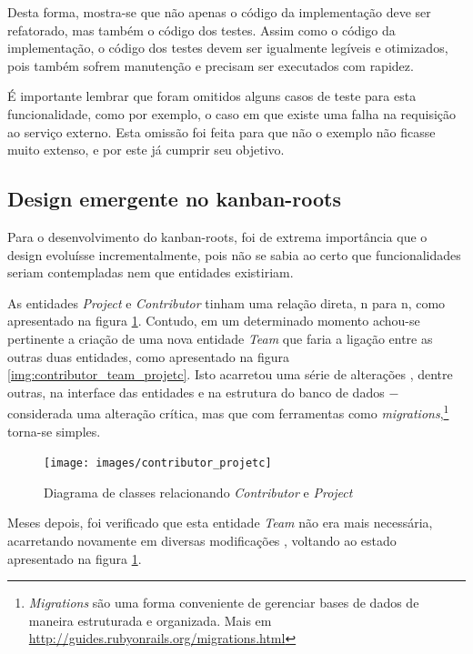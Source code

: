 Desta forma, mostra-se que não apenas o código da implementação deve ser refatorado, mas também o código dos testes. Assim como o código da implementação, o código dos testes devem ser igualmente legíveis e otimizados, pois também sofrem manutenção e precisam ser executados com rapidez.

É importante lembrar que foram omitidos alguns casos de teste para esta funcionalidade, como por exemplo, o caso em que existe uma falha na requisição ao serviço externo. Esta omissão foi feita para que não o exemplo não ficasse muito extenso, e por este já cumprir seu objetivo.


\subsection{Design emergente no kanban-roots}
\label{sub:design_emergente_no_kanban_roots}

Para o desenvolvimento do kanban-roots, foi de extrema importância que o design evoluísse incrementalmente, pois não se sabia ao certo que
funcionalidades seriam contempladas nem que entidades existiriam.

As entidades \textit{Project} e \textit{Contributor} tinham uma relação direta, n para n, como apresentado na figura \ref{img:contributor_projetc}. Contudo, em um determinado momento achou-se pertinente a criação de uma nova entidade \textit{Team} que faria a ligação entre as outras duas entidades, como apresentado na figura \ref{img:contributor_team_projetc}. Isto acarretou uma série de alterações \cite{CommitAddTeam}, dentre outras, na interface das entidades e na estrutura do banco de dados $-$ considerada uma alteração crítica, mas que com ferramentas como \textit{migrations},\footnote{\textit{Migrations} são uma forma conveniente de gerenciar bases de dados de maneira estruturada e organizada. Mais em \url{http://guides.rubyonrails.org/migrations.html}} torna-se simples.

\begin{figure}[h]
  \center
  \caption{Diagrama de classes relacionando \textit{Contributor} e \textit{Project}}
  \texttt{[image: images/contributor\_projetc]}
  \label{img:contributor_projetc}
\end{figure}

Meses depois, foi verificado que esta entidade \textit{Team} não era mais necessária, acarretando novamente em diversas modificações \cite{CommitRemoveTeam}, voltando ao estado apresentado na figura \ref{img:contributor_projetc}.

